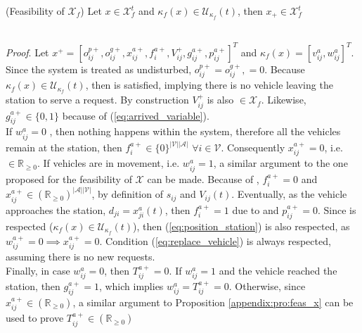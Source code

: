 \begin{proposition}{(Feasibility of $\mathcal{X}_f$)}\label{appendix:pro:feas_xf}
	Let $x \in \mathcal{X}^t_f$ and $\kappa_f(x) \in \mathcal{U}_{\kappa_f}(t)$, then $x_+\in \mathcal{X}^t_f$
\end{proposition}\\

\textit{Proof}. Let $x^+ = [o_{ij}^{p+}, o_{ij}^{g+}, x_{ij}^{a+}, f^{a+}_{i}, V_{ij}^{+}, g^{a+}_{ij}, p^{a+}_{ij}]^T$ and $\kappa_f(x) = [v^{a}_{ij}, w^{a}_{ij}]^T$. Since the system is treated as undisturbed, $o_{ij}^{p+}= o_{ij}^{g+},=0$. Because $\kappa_f(x) \in \mathcal{U}_{\kappa_f}(t)$, then  is satisfied, implying there is no vehicle leaving the station to serve a request. By construction $V_{ij}^{+}$ is also $\in \mathcal{X}_f$. Likewise, $g^{a+}_{ij}\in \{0,1\}$ because of (\ref{eq:arrived_variable}). \\
If $w^a_{ij} = 0$ , then nothing happens within the system, therefore all the vehicles remain at the station, then $ f^{a+}_{i} \in \{0\}^{|\mathcal{V}||\mathcal{A}|}$ $\forall i \in \mathcal{V}$. Consequently   $x_{ij}^{a+} = 0$, i.e.  $\in \mathbb{R}_{\ge 0}$. If vehicles are in movement, i.e. $w^a_{ij} = 1$, a similar argument to the one proposed for the feasibility of $\mathcal{X}$ can be made. Because of , $f^{a+}_{i}=0$ and $x_{ij}^{a+}\in (\mathbb{R}_{\ge 0})^{|\mathcal{A}||\mathcal{V}|}$, by definition of $s_{ij}$ and $V_{ij}(t)$. Eventually, as the vehicle approaches the station, $d_{ji} = x^a_{ji}(t)$, then $f^{a+}_{i}=1$ due to  and $p^{a+}_{ij}=0$. Since 
 is respected ($\kappa_f(x) \in \mathcal{U}_{\kappa_f}(t)$), then  (\ref{eq:position_station}) is also respected, as $ w^{a+}_{ij}=0 \implies x_{ij}^{a+}=0$. Condition (\ref{eq:replace_vehicle}) is always respected, assuming there is no new requests. \\
Finally, in case $w^a_{ij} = 0$, then $T_{ij}^{a+}  = 0$. If $w^a_{ij} = 1$ and the vehicle reached the station, then $g^{a+}_{ij} =1$, which implies $w^a_{ij} = T_{ij}^{a+}  =0$. Otherwise, since $x_{ij}^{a+}\in (\mathbb{R}_{\ge 0})$, a similar argument to Proposition \ref{appendix:pro:feas_x} can be used to prove $T_{ij}^{a+}\in (\mathbb{R}_{\ge 0})$